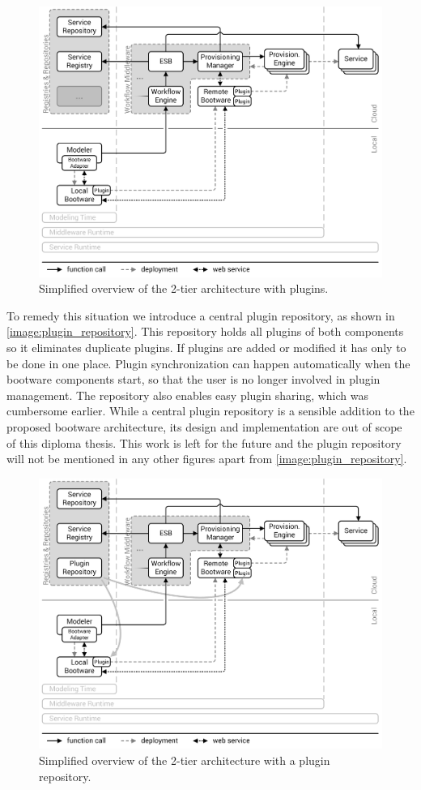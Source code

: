 \begin{figure}[!htbp]
	\centering
	\includegraphics[resolution=600]{design/assets/plugins}
	\caption{Simplified overview of the 2-tier architecture with plugins.}
	\label{image:plugins}
\end{figure}

To remedy this situation we introduce a central plugin repository, as shown in \autoref{image:plugin_repository}.
This repository holds all plugins of both components so it eliminates duplicate plugins.
If plugins are added or modified it has only to be done in one place.
Plugin synchronization can happen automatically when the bootware components start, so that the user is no longer involved in plugin management.
The repository also enables easy plugin sharing, which was cumbersome earlier.
While a central plugin repository is a sensible addition to the proposed bootware architecture, its design and implementation are out of scope of this diploma thesis.
This work is left for the future and the plugin repository will not be mentioned in any other figures apart from \autoref{image:plugin_repository}.

\begin{figure}[!htbp]
	\centering
	\includegraphics[resolution=600]{design/assets/plugin_repository}
	\caption{Simplified overview of the 2-tier architecture with a plugin repository.}
	\label{image:plugin_repository}
\end{figure}
